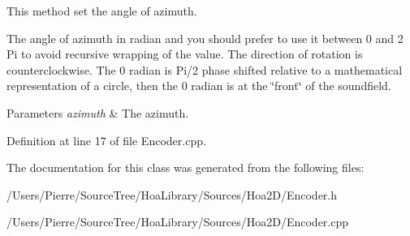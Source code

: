 This method set the angle of azimuth. 

The angle of azimuth in radian and you should prefer to use it between 0 and 2 Pi to avoid recursive wrapping of the value. The direction of rotation is counterclockwise. The 0 radian is Pi/2 phase shifted relative to a mathematical representation of a circle, then the 0 radian is at the \char`\"{}front\char`\"{} of the soundfield.


\begin{DoxyParams}{Parameters}
{\em azimuth} & The azimuth. \\
\hline
\end{DoxyParams}


Definition at line 17 of file Encoder.\-cpp.



The documentation for this class was generated from the following files\-:\begin{DoxyCompactItemize}
\item 
/\-Users/\-Pierre/\-Source\-Tree/\-Hoa\-Library/\-Sources/\-Hoa2\-D/Encoder.\-h\item 
/\-Users/\-Pierre/\-Source\-Tree/\-Hoa\-Library/\-Sources/\-Hoa2\-D/Encoder.\-cpp\end{DoxyCompactItemize}
